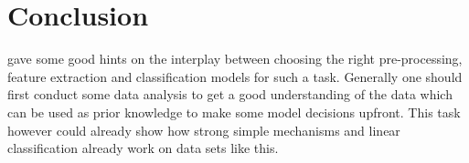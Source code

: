 \documentclass[12pt]{article}
\begin{document}
\section{Conclusion}
gave some good hints on the interplay between choosing the right pre-processing, feature extraction and classification models for such a task. Generally one should first conduct some data analysis to get a good understanding of the data which can be used as prior knowledge to make some model decisions upfront. This task however could already show how strong simple mechanisms and linear classification already work on data sets like this.



\end{document}
